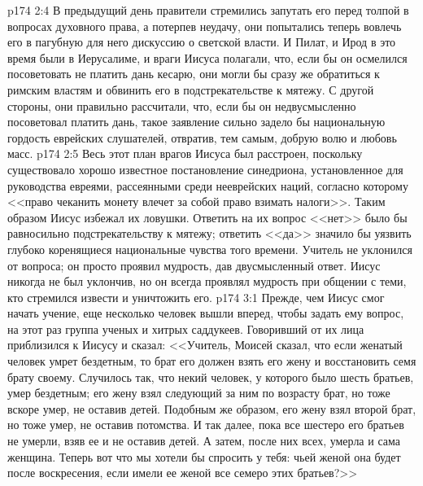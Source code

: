 \vs p174 2:4 В предыдущий день правители стремились запутать его перед толпой в вопросах духовного права, а потерпев неудачу, они попытались теперь вовлечь его в пагубную для него дискуссию о светской власти. И Пилат, и Ирод в это время были в Иерусалиме, и враги Иисуса полагали, что, если бы он осмелился посоветовать не платить дань кесарю, они могли бы сразу же обратиться к римским властям и обвинить его в подстрекательстве к мятежу. С другой стороны, они правильно рассчитали, что, если бы он недвусмысленно посоветовал платить дань, такое заявление сильно задело бы национальную гордость еврейских слушателей, отвратив, тем самым, добрую волю и любовь масс.
\vs p174 2:5 Весь этот план врагов Иисуса был расстроен, поскольку существовало хорошо известное постановление синедриона, установленное для руководства евреями, рассеянными среди нееврейских наций, согласно которому <<право чеканить монету влечет за собой право взимать налоги>>. Таким образом Иисус избежал их ловушки. Ответить на их вопрос <<нет>> было бы равносильно подстрекательству к мятежу; ответить <<да>> значило бы уязвить глубоко коренящиеся национальные чувства того времени. Учитель не уклонился от вопроса; он просто проявил мудрость, дав двусмысленный ответ. Иисус никогда не был уклончив, но он всегда проявлял мудрость при общении с теми, кто стремился извести и уничтожить его.
\vs p174 3:1 Прежде, чем Иисус смог начать учение, еще несколько человек вышли вперед, чтобы задать ему вопрос, на этот раз группа ученых и хитрых саддукеев. Говоривший от их лица приблизился к Иисусу и сказал: <<Учитель, Моисей сказал, что если женатый человек умрет бездетным, то брат его должен взять его жену и восстановить семя брату своему. Случилось так, что некий человек, у которого было шесть братьев, умер бездетным; его жену взял следующий за ним по возрасту брат, но тоже вскоре умер, не оставив детей. Подобным же образом, его жену взял второй брат, но тоже умер, не оставив потомства. И так далее, пока все шестеро его братьев не умерли, взяв ее и не оставив детей. А затем, после них всех, умерла и сама женщина. Теперь вот что мы хотели бы спросить у тебя: чьей женой она будет после воскресения, если имели ее женой все семеро этих братьев?>>
